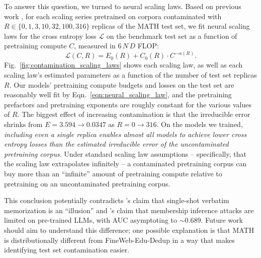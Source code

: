 To answer this question, we turned to neural scaling laws.
Based on previous work \citep{kaplan2020scaling, hoffman2022chinchilla, openai2024gpt4technicalreport, hu2024predictingemergentabilitiesinfinite, schaeffer2025pretrainingscalinglawsgenerative}, for each scaling series pretrained on corpora contaminated with $R \in \{0, 1, 3, 10, 32, 100, 316\}$ replicas of the MATH test set, we fit neural scaling laws for the cross entropy loss $\mathcal{L}$ on the benchmark test set as a function of pretraining compute $C$, measured in $6\,N\,D$ FLOP:
%
\begin{equation}
    \label{eqn:neural_scaling_law}
    \mathcal{L}(C, R) = E_0(R) + C_0(R) \cdot C^{-\alpha(R)}.
\end{equation}
%
%
Fig.~\ref{fig:contamination_scaling_laws} shows each scaling law, as well as each scaling law's estimated parameters as a function of the number of test set replicas $R$.
Our models' pretraining compute budgets and losses on the test set are reasonably well fit by Eqn.~\ref{eqn:neural_scaling_law}, and the pretraining prefactors and pretraining exponents are roughly constant for the various values of $R$.
The biggest effect of increasing contamination is that the irreducible error shrinks from $E = 3.594 \rightarrow 0.0347$ as $R=0 \rightarrow 316$.
On the models we trained, \emph{including even a single replica enables almost all models to achieve lower cross entropy losses than the estimated irreducible error of the uncontaminated pretraining corpus}.
Under standard scaling law assumptions -- specifically, that the scaling law extrapolates infinitely -- a contaminated pretraining corpus can buy more than an ``infinite'' amount of pretraining compute relative to pretraining on an uncontaminated pretraining corpus.

This conclusion potentially contradicts \citet{huang2024demystifying}'s claim that single-shot verbatim memorization is an ``illusion''  and \citet{hayes2025exploring}'s claim that membership inference attacks are limited on pre-trained LLMs, with AUC asymptoting to $\mathord{\sim}0.689$.
Future work should aim to understand this difference; one possible explanation is that MATH is distributionally different from FineWeb-Edu-Dedup in a way that makes identifying test set contamination easier.

